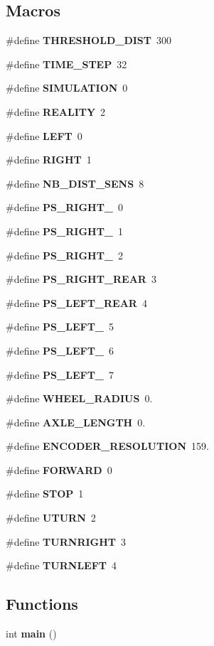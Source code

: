 \subsection*{Macros}
\begin{DoxyCompactItemize}
\item 
\#define {\bf T\-H\-R\-E\-S\-H\-O\-L\-D\-\_\-\-D\-I\-S\-T}~300
\item 
\#define {\bf T\-I\-M\-E\-\_\-\-S\-T\-E\-P}~32
\item 
\#define {\bf S\-I\-M\-U\-L\-A\-T\-I\-O\-N}~0
\item 
\#define {\bf R\-E\-A\-L\-I\-T\-Y}~2
\item 
\#define {\bf L\-E\-F\-T}~0
\item 
\#define {\bf R\-I\-G\-H\-T}~1
\item 
\#define {\bf N\-B\-\_\-\-D\-I\-S\-T\-\_\-\-S\-E\-N\-S}~8
\item 
\#define {\bf P\-S\-\_\-\-R\-I\-G\-H\-T\-\_}~0
\item 
\#define {\bf P\-S\-\_\-\-R\-I\-G\-H\-T\-\_}~1
\item 
\#define {\bf P\-S\-\_\-\-R\-I\-G\-H\-T\-\_}~2
\item 
\#define {\bf P\-S\-\_\-\-R\-I\-G\-H\-T\-\_\-\-R\-E\-A\-R}~3
\item 
\#define {\bf P\-S\-\_\-\-L\-E\-F\-T\-\_\-\-R\-E\-A\-R}~4
\item 
\#define {\bf P\-S\-\_\-\-L\-E\-F\-T\-\_}~5
\item 
\#define {\bf P\-S\-\_\-\-L\-E\-F\-T\-\_}~6
\item 
\#define {\bf P\-S\-\_\-\-L\-E\-F\-T\-\_}~7
\item 
\#define {\bf W\-H\-E\-E\-L\-\_\-\-R\-A\-D\-I\-U\-S}~0.
\item 
\#define {\bf A\-X\-L\-E\-\_\-\-L\-E\-N\-G\-T\-H}~0.
\item 
\#define {\bf E\-N\-C\-O\-D\-E\-R\-\_\-\-R\-E\-S\-O\-L\-U\-T\-I\-O\-N}~159.
\item 
\#define {\bf F\-O\-R\-W\-A\-R\-D}~0
\item 
\#define {\bf S\-T\-O\-P}~1
\item 
\#define {\bf U\-T\-U\-R\-N}~2
\item 
\#define {\bf T\-U\-R\-N\-R\-I\-G\-H\-T}~3
\item 
\#define {\bf T\-U\-R\-N\-L\-E\-F\-T}~4
\end{DoxyCompactItemize}
\subsection*{Functions}
\begin{DoxyCompactItemize}
\item 
int {\bf main} ()
\end{DoxyCompactItemize}
